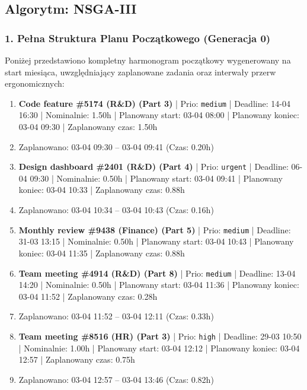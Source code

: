 \vspace{0.8cm}
\subsection{Algorytm: NSGA-III}

\subsubsection*{1. Pełna Struktura Planu Początkowego (Generacja 0)}
Poniżej przedstawiono kompletny harmonogram początkowy wygenerowany na start miesiąca, uwzględniający zaplanowane zadania oraz interwały przerw ergonomicznych:

{\footnotesize
\begin{enumerate}
  \item [\textbf{14646}] \textbf{Code feature \#5174 (R\&D) (Part 3)} | Prio: \texttt{medium} | Deadline: 14-04 16:30 | Nominalnie: 1.50h | Planowany start: 03-04 08:00 | Planowany koniec: 03-04 09:30 | Zaplanowany czas: 1.50h
  \item [\textbf{PRZERWA}] Zaplanowano: 03-04 09:30 -- 03-04 09:41 (Czas: 0.20h)
  \item [\textbf{14603}] \textbf{Design dashboard \#2401 (R\&D) (Part 4)} | Prio: \texttt{urgent} | Deadline: 06-04 09:30 | Nominalnie: 0.50h | Planowany start: 03-04 09:41 | Planowany koniec: 03-04 10:33 | Zaplanowany czas: 0.88h
  \item [\textbf{PRZERWA}] Zaplanowano: 03-04 10:34 -- 03-04 10:43 (Czas: 0.16h)
  \item [\textbf{14656}] \textbf{Monthly review \#9438 (Finance) (Part 5)} | Prio: \texttt{medium} | Deadline: 31-03 13:15 | Nominalnie: 0.50h | Planowany start: 03-04 10:43 | Planowany koniec: 03-04 11:35 | Zaplanowany czas: 0.88h
  \item [\textbf{14638}] \textbf{Team meeting \#4914 (R\&D) (Part 8)} | Prio: \texttt{medium} | Deadline: 13-04 14:20 | Nominalnie: 0.50h | Planowany start: 03-04 11:36 | Planowany koniec: 03-04 11:52 | Zaplanowany czas: 0.28h
  \item [\textbf{PRZERWA}] Zaplanowano: 03-04 11:52 -- 03-04 12:11 (Czas: 0.33h)
  \item [\textbf{14624}] \textbf{Team meeting \#8516 (HR) (Part 3)} | Prio: \texttt{high} | Deadline: 29-03 10:50 | Nominalnie: 1.00h | Planowany start: 03-04 12:12 | Planowany koniec: 03-04 12:57 | Zaplanowany czas: 0.75h
  \item [\textbf{PRZERWA}] Zaplanowano: 03-04 12:57 -- 03-04 13:46 (Czas: 0.82h)

\end{enumerate}}
